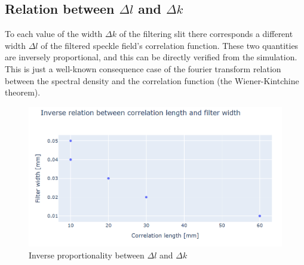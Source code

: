 \subsection{Relation between \texorpdfstring{$\Delta l$}{dl} and \texorpdfstring{$\Delta k$}{dk}}

To each value of the width $\Delta k$ of the filtering slit there corresponds a different width $\Delta l$  of the filtered speckle field's correlation function. 
These two quantities are inversely proportional, and this can be directly verified from the simulation. This is just a well-known consequence case of the fourier transform 
relation between the spectral density and the correlation function (the Wiener-Kintchine theorem).

\begin{figure}[!ht]
    \centering
    \includegraphics[width = \textwidth]{Img/inv.png}
    \caption{Inverse proportionality between $\Delta l$ and $\Delta k$}
    \label{inv}
\end{figure}